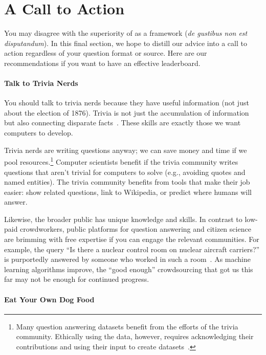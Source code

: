 

\section{A Call to Action}
\label{sec:call}


You may disagree with the superiority of \qb{} as a \qa{} framework (\textit{de gustibus non est disputandum}).
In this final section, we hope to distill our advice into a call to action regardless of your question format or source.
Here are our recommendations if you want to have an effective leaderboard.

\paragraph{Talk to Trivia Nerds}

You should talk to trivia nerds because they have useful information (not just about the election of 1876).
Trivia is not just the accumulation of information but also connecting disparate facts~\cite{jennings-06}.
These skills are exactly those we want computers to develop.

Trivia nerds are writing questions anyway; we can save money and time
if we pool resources.\footnote{Many question answering datasets
  benefit from the efforts of the trivia community.
Ethically using the data, however, requires acknowledging their
contributions and using their input to create datasets~\cite[Consent
  and Inclusivity criterion]{jo-20}.}
Computer scientists benefit if the trivia community writes questions
that aren't trivial for computers to solve (e.g., avoiding quotes and
named entities).
The trivia community benefits from tools that make their job easier:
show related questions, link to Wikipedia, or predict where humans
will answer.

Likewise, the broader public has unique knowledge and skills.
In contrast to low-paid crowdworkers, public platforms for question
answering and citizen science~\cite{bowser-13} are brimming with free
expertise if you can engage the relevant communities.
For example, the  query ``Is there a nuclear control room
on nuclear aircraft carriers?'' is purportedly answered by someone who
worked in such a room~\cite{humphries-17}.
As machine learning algorithms improve, the ``good enough''
crowdsourcing that got us this far may not be enough for
continued progress.

\paragraph{Eat Your Own Dog Food}

